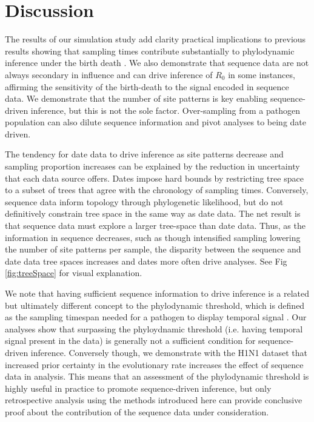 \documentclass{article}
\begin{document}
\section*{Discussion}
The results of our simulation study add clarity practical implications to previous results showing that sampling times contribute substantially to phylodynamic inference under the birth death \citep{volz_sampling_2014, Featherstone2021Infectious}. We also demonstrate that sequence data are not always secondary in influence and can drive inference of $R_{0}$ in some instances, affirming the sensitivity of the birth-death to the signal encoded in sequence data. We demonstrate that the number of site patterns is key enabling sequence-driven inference, but this is not the sole factor. Over-sampling from a pathogen population can also dilute sequence information and pivot analyses to being date driven.

The tendency for date data to drive inference as site patterns decrease and sampling proportion increases can be explained by the reduction in uncertainty that each data source offers. Dates impose hard bounds by restricting tree space to a subset of trees that agree with the chronology of sampling times. Conversely, sequence data inform topology through phylogenetic likelihood, but do not definitively constrain tree space in the same way as date data. The net result is that sequence data must explore a larger tree-space than date data. Thus, as the information in sequence decreases, such as though intensified sampling lowering the number of site patterns per sample, the disparity between the sequence and date data tree spaces increases and dates more often drive analyses. See Fig \ref{fig:treeSpace} for visual explanation.

We note that having sufficient sequence information to drive inference is a related but ultimately different concept to the phylodynamic threshold, which is defined as the sampling timespan needed for a pathogen to display temporal signal \citep{duchene_temporal_2020}. Our analyses show that surpassing the phyloydnamic threshold (i.e. having temporal signal present in the data) is generally not a sufficient condition for sequence-driven inference. Conversely though, we demonstrate with the H1N1 dataset that increased prior certainty in the evolutionary rate increases the effect of sequence data in analysis. This means that an assessment of the phylodynamic threshold is highly useful in practice to promote sequence-driven inference, but only retrospective analysis using the methods introduced here can provide conclusive proof about the contribution of the sequence data under consideration.
\end{document}
